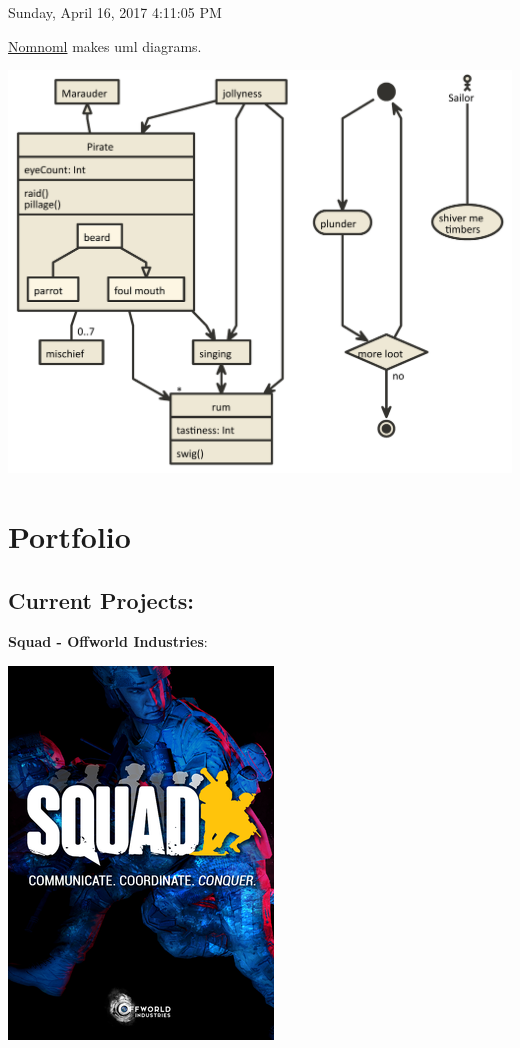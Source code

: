 \documentclass[]{book}
\begin{document}
 Sunday, April 16, 2017 4:11:05 PM

\href{http://nomnoml.com}{Nomnoml} makes uml diagrams.

\includegraphics{Image/Pirate.nomnoml.pdf}

\chapter{Portfolio}\label{portfolio}

\section{Current Projects:}\label{current-projects}

\textbf{Squad - Offworld Industries}:

\includegraphics{Image/Squad_(videogame)_2016_frontcover.png}
\end{document}
